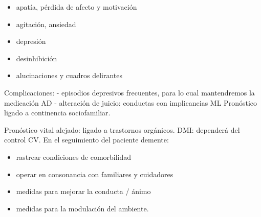 \begin{itemize}
	\item apatía, pérdida de afecto y motivación
	\item agitación, ansiedad
	\item depresión
	\item desinhibición
	\item alucinaciones y cuadros delirantes 
\end{itemize}

Complicaciones: 
- episodios depresivos frecuentes, para lo cual mantendremos la medicación AD 
- alteración de juicio: conductas con implicancias ML Pronóstico ligado a continencia sociofamiliar. 

Pronóstico vital alejado: ligado a trastornos orgánicos. DMI: dependerá del control CV. En el seguimiento del paciente demente:
 
\begin{itemize}
	\item rastrear condiciones de comorbilidad 
	\item operar en consonancia con familiares y cuidadores 
	\item medidas para mejorar la conducta / ánimo 
	\item medidas para la modulación del ambiente.
\end{itemize}
\printbibliography
